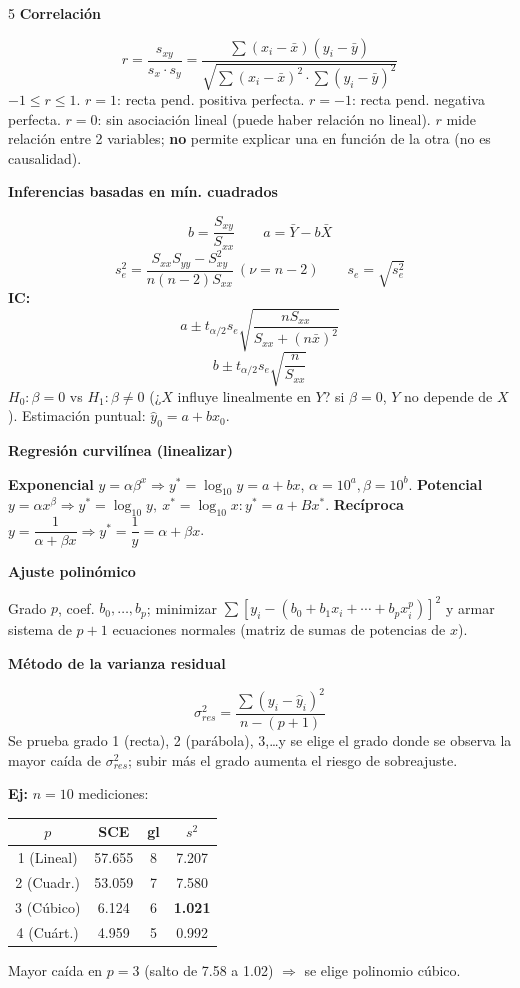 \documentclass[9pt,a4paper]{article}
\newcommand{\bodysize}{\fontsize{7.5}{8.7}\selectfont}
\newcommand{\notesize}{\fontsize{6.4}{7.4}\selectfont}
\newcommand{\subsize}{\fontsize{8.6}{10}\selectfont\bfseries}
\newcommand{\topic}[2]{\subsize\textcolor{#1!60!black}{#2}\par\vspace{0.5pt}\bodysize}
\newcommand{\ejemplo}[1]{{\notesize\textbf{Ej:} #1\par}\bodysize}
\begin{document}
\begin{multicols}{5}
\topic{orange}{Correlación}
\[
r=\frac{s_{xy}}{s_x\cdot s_y}=\frac{\sum(x_i-\bar x)(y_i-\bar y)}{\sqrt{\sum(x_i-\bar x)^2\cdot\sum(y_i-\bar y)^2}}
\]
$-1\leq r\leq1$. $r=1$: recta pend. positiva perfecta. $r=-1$: recta pend. negativa perfecta. $r=0$: sin asociación lineal (puede haber relación no lineal). $r$ mide relación entre 2 variables; \textbf{no} permite explicar una en función de la otra (no es causalidad).

\topic{orange}{Inferencias basadas en mín. cuadrados}
\[
b=\frac{S_{xy}}{S_{xx}} \qquad a=\bar Y-b\bar X
\]
{\notesize
\[
s_e^2=\frac{S_{xx}S_{yy}-S_{xy}^2}{n(n-2)S_{xx}}\ (\nu=n-2) \qquad s_e=\sqrt{s_e^2}
\]
}
\textbf{IC:}
\[
a\pm t_{\alpha/2}s_e\sqrt{\frac{nS_{xx}}{S_{xx}+(n\bar x)^2}}
\]
\[
b\pm t_{\alpha/2}s_e\sqrt{\frac{n}{S_{xx}}}
\]
$H_0:\beta=0$ vs $H_1:\beta\neq0$ (¿$X$ influye linealmente en $Y$? si $\beta=0$, $Y$ no depende de $X$). Estimación puntual: $\hat y_0=a+bx_0$.

\topic{orange}{Regresión curvilínea (linealizar)}
\textbf{Exponencial} $y=\alpha\beta^x\Rightarrow y^*=\log_{10}y=a+bx$, $\alpha=10^a,\beta=10^b$.
\textbf{Potencial} $y=\alpha x^\beta\Rightarrow y^*=\log_{10}y,\ x^*=\log_{10}x: y^*=a+Bx^*$.
\textbf{Recíproca} $y=\dfrac{1}{\alpha+\beta x}\Rightarrow y^*=\dfrac{1}{y}=\alpha+\beta x$.

\topic{orange}{Ajuste polinómico}
Grado $p$, coef. $b_0,\ldots,b_p$; minimizar $\sum[y_i-(b_0+b_1x_i+\cdots+b_px_i^p)]^2$ y armar sistema de $p+1$ ecuaciones normales (matriz de sumas de potencias de $x$).

\topic{orange}{Método de la varianza residual}
\[
\sigma_{res}^2=\frac{\sum(y_i-\hat y_i)^2}{n-(p+1)}
\]
Se prueba grado 1 (recta), 2 (parábola), 3,\ldots y se elige el grado donde se observa la mayor caída de $\sigma_{res}^2$; subir más el grado aumenta el riesgo de sobreajuste.

\ejemplo{$n=10$ mediciones:
\begin{center}
{\notesize
\setlength{\tabcolsep}{3pt}
\begin{tabular}{@{}c c c c@{}}
\toprule
$p$ & SCE & gl & $s^2$ \\
\midrule
1 (Lineal) & 57.655 & 8 & 7.207 \\
2 (Cuadr.) & 53.059 & 7 & 7.580 \\
3 (Cúbico) & 6.124 & 6 & \textbf{1.021} \\
4 (Cuárt.) & 4.959 & 5 & 0.992 \\
\bottomrule
\end{tabular}
}
\end{center}
Mayor caída en $p=3$ (salto de 7.58 a 1.02) $\Rightarrow$ se elige polinomio cúbico.}


\end{multicols}
\end{document}
